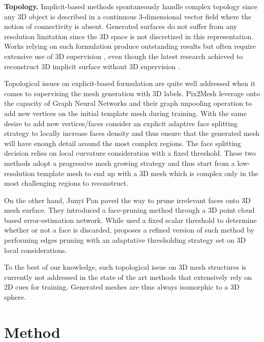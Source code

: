 \noindent\textbf{Topology.} Implicit-based methods spontaneously handle complex topology since any 3D object is described in a continuous 3-dimensional vector field where the notion of connectivity is absent. Generated surfaces do not suffer from any resolution limitation since the 3D space is not discretized in this representation. Works relying on such formulation produce outstanding results but often require extensive use of 3D supervision \citep{saito2020pifuhd}, even though the latest research achieved to reconstruct 3D implicit surface without 3D supervision \citep{niemeyer2020differentiable,liu2019learning}. 

Topological issues on explicit-based formulation are quite well addressed when it comes to supervising the mesh generation with 3D labels. Pix2Mesh \citep{wang2018pixel2mesh} leverage onto the capacity of Graph Neural Networks and their graph unpooling operation to add new vertices on the initial template mesh during training. With the same desire to add new vertices/faces \citep{smith2019geometrics} consider an explicit adaptive face splitting strategy to locally increase faces density and thus ensure that the generated mesh will have enough detail around the most complex regions. The face splitting decision relies on local curvature consideration with a fixed threshold. These two methods adopt a progressive mesh growing strategy and thus start from a low-resolution template mesh to end up with a 3D mesh which is complex only in the most challenging regions to reconstruct.

On the other hand, Junyi Pan \etal \citep{pan2019deep} paved the way to prune irrelevant faces onto 3D mesh surface. They introduced a face-pruning method through a 3D point cloud based error-estimation network. While \citep{pan2019deep} used a fixed scalar threshold to determine whether or not a face is discarded, \citep{nie2020total3dunderstanding} proposes a refined version of such method by performing edges pruning with an adaptative thresholding strategy set on 3D local considerations.

To the best of our knowledge,  such topological issue on 3D mesh structures is currently not addressed in the state of the art methods that extensively rely on 2D cues for training. Generated meshes are thus always isomorphic to a 3D sphere.  

\section{Method}
\label{sec:method}

